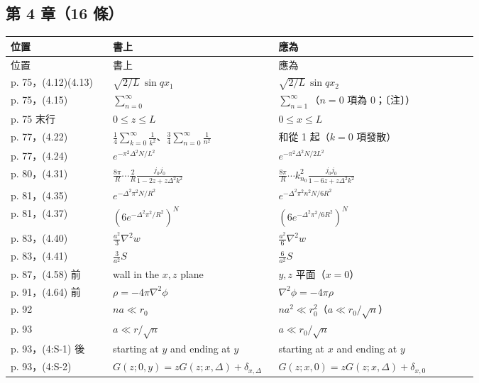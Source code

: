 \subsection{第 4 章（16 條）}
{\footnotesize\renewcommand{\arraystretch}{1.1}\setlength{\tabcolsep}{4pt}
\begin{longtable}{@{}>{\raggedright\arraybackslash}p{0.21\linewidth}>{\raggedright\arraybackslash}p{0.34\linewidth}>{\raggedright\arraybackslash}p{0.41\linewidth}@{}}
\toprule 位置 & 書上 & 應為\\ \midrule\endfirsthead
\toprule 位置 & 書上 & 應為\\ \midrule\endhead
\bottomrule\endfoot
p. 75，(4.12)(4.13) & $\sqrt{2/L}\,\sin qx_1$ & $\sqrt{2/L}\,\sin qx_2$\\
p. 75，(4.15) & $\sum_{n=0}^{\infty}$ & $\sum_{n=1}^{\infty}$（$n=0$ 項為 0；〔注〕）\\
p. 75 末行 & $0\le z\le L$ & $0\le x\le L$\\
p. 77，(4.22) & $\frac14\sum_{k=0}^\infty\frac1{k^2}$、$\frac34\sum_{n=0}^\infty\frac1{n^2}$ & 和從 1 起（$k=0$ 項發散）\\
p. 77，(4.24) & $e^{-\pi^2\Delta^2N/L^2}$ & $e^{-\pi^2\Delta^2N/2L^2}$\\
p. 80，(4.31) & $\frac{8\pi}{R}\cdots\frac2R\frac{j_0j_0}{1-2z+z\Delta^2k^2}$ & $\frac{8\pi}{R}\cdots k_{n_0}^2\frac{j_0j_0}{1-6z+z\Delta^2k^2}$\\
p. 81，(4.35) & $e^{-\Delta^2\pi^2N/R^2}$ & $e^{-\Delta^2\pi^2n^2N/6R^2}$\\
p. 81，(4.37) & $(6e^{-\Delta^2\pi^2/R^2})^N$ & $(6e^{-\Delta^2\pi^2/6R^2})^N$\\
p. 83，(4.40) & $\frac{a^2}{3}\nabla^2w$ & $\frac{a^2}{6}\nabla^2w$\\
p. 83，(4.41) & $\frac{3}{a^2}S$ & $\frac{6}{a^2}S$\\
p. 87，(4.58) 前 & wall in the $x,z$ plane & $y,z$ 平面（$x=0$）\\
p. 91，(4.64) 前 & $\rho=-4\pi\nabla^2\phi$ & $\nabla^2\phi=-4\pi\rho$\\
p. 92 & $na\ll r_0$ & $na^2\ll r_0^2$（$a\ll r_0/\sqrt n$）\\
p. 93 & $a\ll r/\sqrt n$ & $a\ll r_0/\sqrt n$\\
p. 93，(4:S-1) 後 & starting at $y$ and ending at $y$ & starting at $x$ and ending at $y$\\
p. 93，(4:S-2) & $G(z;0,y)=zG(z;x,\Delta)+\delta_{x,\Delta}$ & $G(z;x,0)=zG(z;x,\Delta)+\delta_{x,0}$\\
\end{longtable}}

